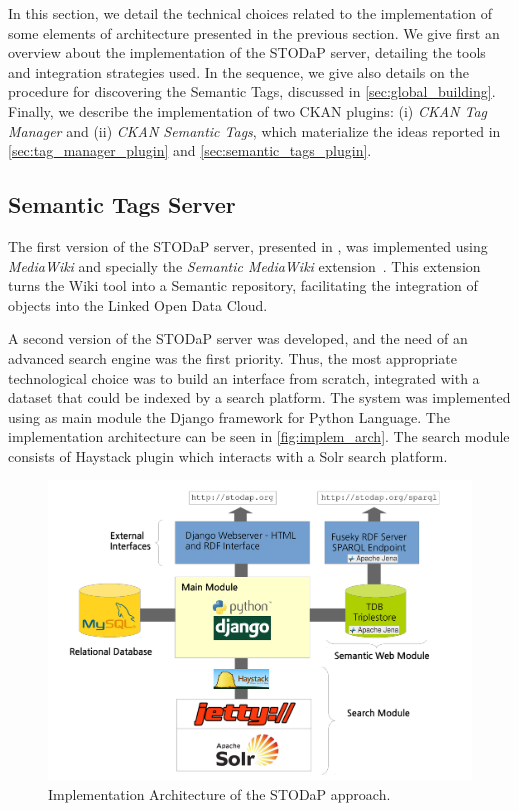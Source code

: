 In this section, we detail the technical choices related to the implementation of some elements of architecture presented in the previous section.
We give first an overview about the implementation of the STODaP server, detailing the tools and integration strategies used.
In the sequence, we give also details on the procedure for discovering the Semantic Tags, discussed in \autoref{sec:global_building}.
Finally, we describe the implementation of two CKAN plugins:
(i) \emph{CKAN Tag Manager} and 
(ii) \emph{CKAN Semantic Tags}, which materialize the ideas reported in \autoref{sec:tag_manager_plugin} and \autoref{sec:semantic_tags_plugin}.

\subsection{Semantic Tags Server}

The first version of the STODaP server, presented in , was implemented using \emph{MediaWiki} and specially the \emph{Semantic MediaWiki} extension~\cite{Kroetzsch2007}.
This extension turns the Wiki tool into a Semantic repository, facilitating the integration of objects into the Linked Open Data Cloud.

A second version of the STODaP server was developed, and the need of an advanced search engine was the first priority.
Thus, the most appropriate technological choice was to build an interface from scratch, integrated with a dataset that could be indexed by a search platform.
The system was implemented using as main module the Django framework for Python Language.
The implementation architecture can be seen in \autoref{fig:implem_arch}.
The search module consists of Haystack plugin which interacts with a Solr search platform.

\begin{figure}[h]
\begin{center}
\includegraphics[width=\columnwidth]{images/implementation_architecture.pdf}
\caption[Implementation Architecture of the STODaP approach.]{Implementation Architecture of the STODaP approach.}
\label{fig:implem_arch}
\end{center}
\end{figure}

